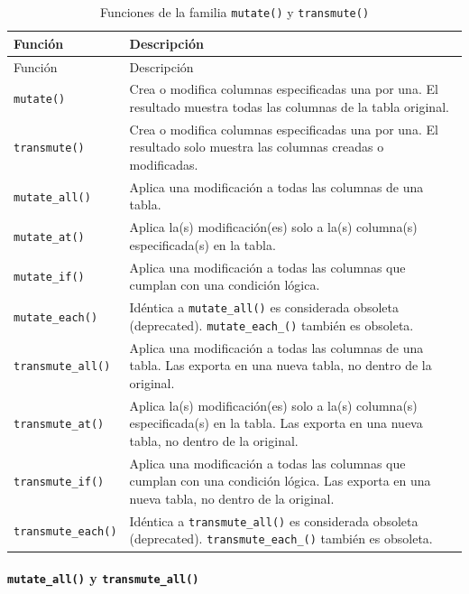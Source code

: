 \documentclass[
]{article}
\theoremstyle{definition}
\theoremstyle{definition}
\theoremstyle{definition}
\theoremstyle{definition}
\theoremstyle{remark}
\begin{document}
\begin{longtable}[]{@{}ll@{}}
\caption{\label{tab:unnamed-chunk-55}Funciones de la familia \texttt{mutate()} y \texttt{transmute()}}\tabularnewline
\toprule()
Función & Descripción \\
\midrule()
\endfirsthead
\toprule()
Función & Descripción \\
\midrule()
\endhead
\texttt{mutate()} & Crea o modifica columnas especificadas una por una. El resultado muestra todas las columnas de la tabla original. \\
\texttt{transmute()} & Crea o modifica columnas especificadas una por una. El resultado solo muestra las columnas creadas o modificadas. \\
\texttt{mutate\_all()} & Aplica una modificación a todas las columnas de una tabla. \\
\texttt{mutate\_at()} & Aplica la(s) modificación(es) solo a la(s) columna(s) especificada(s) en la tabla. \\
\texttt{mutate\_if()} & Aplica una modificación a todas las columnas que cumplan con una condición lógica. \\
\texttt{mutate\_each()} & Idéntica a \texttt{mutate\_all()} es considerada obsoleta (deprecated). \texttt{mutate\_each\_()} también es obsoleta. \\
\texttt{transmute\_all()} & Aplica una modificación a todas las columnas de una tabla. Las exporta en una nueva tabla, no dentro de la original. \\
\texttt{transmute\_at()} & Aplica la(s) modificación(es) solo a la(s) columna(s) especificada(s) en la tabla. Las exporta en una nueva tabla, no dentro de la original. \\
\texttt{transmute\_if()} & Aplica una modificación a todas las columnas que cumplan con una condición lógica. Las exporta en una nueva tabla, no dentro de la original. \\
\texttt{transmute\_each()} & Idéntica a \texttt{transmute\_all()} es considerada obsoleta (deprecated). \texttt{transmute\_each\_()} también es obsoleta. \\
\bottomrule()
\end{longtable}

\hypertarget{mutate_all-y-transmute_all}{%
\paragraph{\texorpdfstring{\texttt{mutate\_all()} y \texttt{transmute\_all()}}{mutate\_all() y transmute\_all()}}\label{mutate_all-y-transmute_all}}
\end{document}
